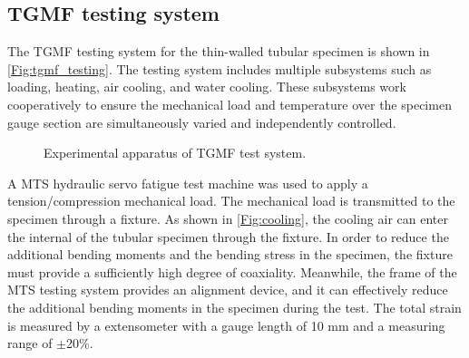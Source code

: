 \documentclass[preprint,5p,twocolumn,11pt,sort&compress]{elsarticle}
\begin{document}
\subsection{TGMF testing system}
The TGMF testing system for the thin-walled tubular specimen is shown in \autoref{Fig:tgmf_testing}. The testing system includes multiple subsystems such as loading, heating, air cooling, and water cooling. These subsystems work cooperatively to ensure the mechanical load and temperature over the specimen gauge section are simultaneously varied and independently controlled. 
\begin{figure}[!htp]
\caption{Experimental apparatus of TGMF test system.}
\label{Fig:tgmf_testing}
\end{figure}

A MTS hydraulic servo fatigue test machine was used to apply a tension/compression mechanical load. The mechanical load is transmitted to the specimen through a fixture. As shown in \autoref{Fig:cooling}, the cooling air can enter the internal of the tubular specimen through the fixture. In order to reduce the additional bending moments and the bending stress in the specimen, the fixture must provide a sufficiently high degree of coaxiality. Meanwhile, the frame of the MTS testing system provides an alignment device, and it can effectively reduce the additional bending moments in the specimen during the test. The total strain is measured by a extensometer with a gauge length of 10 mm and a measuring range of $\pm$20\%. 
\end{document}

